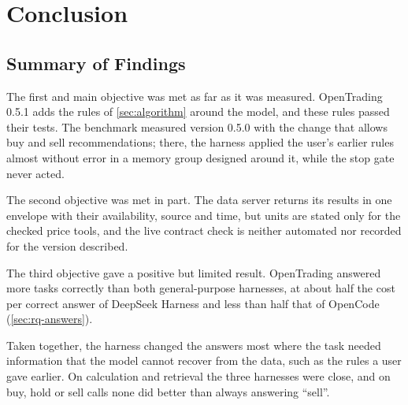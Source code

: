 \chapter{Conclusion}\label{ch:conclusion}

\section{Summary of Findings}\label{sec:summary}
The first and main objective was met as far as it was measured.
OpenTrading 0.5.1 adds the rules of \cref{sec:algorithm} around the model, and these rules passed their tests.
The benchmark measured version 0.5.0 with the change that allows buy and sell recommendations; there, the harness applied the user's earlier rules almost without error in a memory group designed around it, while the stop gate never acted.

The second objective was met in part.
The data server returns its results in one envelope with their availability, source and time, but units are stated only for the checked price tools, and the live contract check is neither automated nor recorded for the version described.

The third objective gave a positive but limited result.
OpenTrading answered more tasks correctly than both general-purpose harnesses, at about half the cost per correct answer of DeepSeek Harness and less than half that of OpenCode (\cref{sec:rq-answers}).

Taken together, the harness changed the answers most where the task needed information that the model cannot recover from the data, such as the rules a user gave earlier.
On calculation and retrieval the three harnesses were close, and on buy, hold or sell calls none did better than always answering \enquote{sell}.

